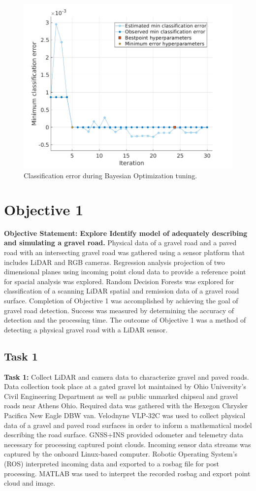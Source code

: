 \documentclass[numbered,pdftex]{ohio-etd}
\begin{document}
{		\begin{figure}
			\centering
			\includegraphics[width=0.7\linewidth]{Defense_Images/c2_min_class_error}
			\caption[RDF Training Classification Error]{Classification error during Bayesian Optimization tuning.}
			\label{fig:c2_min_class_error}
		\end{figure}

	\section{Objective 1}{
		
		{\textbf{Objective Statement: Explore Identify model of adequately describing and simulating a gravel road.} Physical data of a gravel road and a paved road with an intersecting gravel road was gathered using a sensor platform that includes LiDAR and RGB cameras. Regression analysis projection of two dimensional planes using incoming point cloud data to provide a reference point for spacial analysis was explored. Random Decision Forests was explored for classification of a scanning LiDAR spatial and remission data of a gravel road surface. Completion of Objective 1 was accomplished by achieving the goal of gravel road detection. Success was measured by determining the accuracy of detection and the processing time. The outcome of Objective 1 was a method of detecting a physical gravel road with a LiDAR sensor.}
	
		\subsection{Task 1}{
	
			\textbf{Task 1: }{Collect LiDAR and camera data to characterize gravel and paved roads. Data collection took place at a gated gravel lot maintained by Ohio University's Civil Engineering Department as well as public unmarked chipseal and gravel roads near Athens Ohio. Required data was gathered with the Hexegon Chrysler Pacifica New Eagle DBW van. Velodnyne VLP-32C was used to collect physical data of a gravel and paved road surfaces in order to inform a mathematical model describing the road surface. GNSS+INS provided odometer and telemetry data necessary for processing captured point clouds. Incoming sensor data streams was captured by the onboard Linux-based computer. Robotic Operating System's (ROS) interpreted incoming data and exported to a rosbag file for post processing. MATLAB was used to interpret the recorded rosbag and export point cloud and image. }
	
}}}
\end{document}
